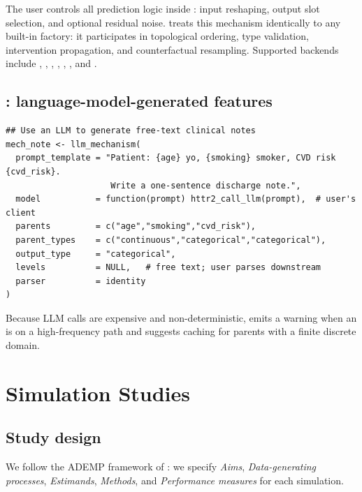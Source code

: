\documentclass[article]{jss}
\begin{document}
The user controls all prediction logic inside : input
reshaping, output slot selection, and optional residual noise. 
treats this mechanism identically to any built-in factory: it participates in
topological ordering, type validation, intervention propagation, and counterfactual
resampling. Supported backends include , , ,
, , , and .

\subsection{: language-model-generated features}
\label{sec:llm}

\begin{tcolorbox}[codebox, title={\small\textbf{R} code}]
\begin{verbatim}
## Use an LLM to generate free-text clinical notes
mech_note <- llm_mechanism(
  prompt_template = "Patient: {age} yo, {smoking} smoker, CVD risk {cvd_risk}.
                     Write a one-sentence discharge note.",
  model           = function(prompt) httr2_call_llm(prompt),  # user's client
  parents         = c("age","smoking","cvd_risk"),
  parent_types    = c("continuous","categorical","categorical"),
  output_type     = "categorical",
  levels          = NULL,   # free text; user parses downstream
  parser          = identity
)
\end{verbatim}
\end{tcolorbox}

Because LLM calls are expensive and non-deterministic, 
emits a warning when an  is on a high-frequency path and
suggests caching for parents with a finite discrete domain.

\section{Simulation Studies}
\label{sec:sims}

\subsection{Study design}
\label{sec:sim_design}

We follow the ADEMP framework of \citet{morris2019using}: we specify
\emph{Aims}, \emph{Data-generating processes}, \emph{Estimands},
\emph{Methods}, and \emph{Performance measures} for each simulation.
\end{document}
